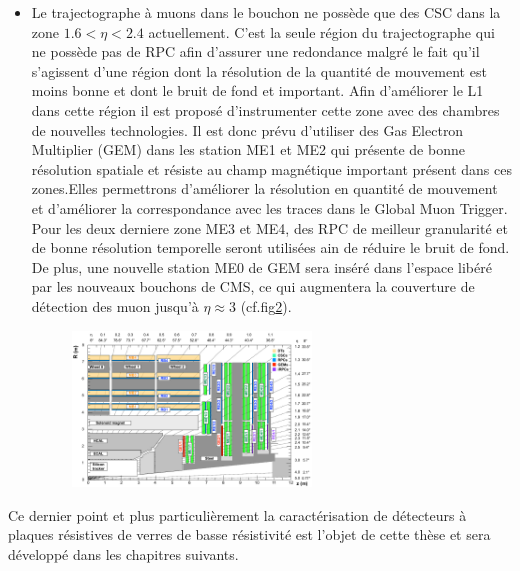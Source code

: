 \begin{itemize}[label=$\bullet$]
\begin{figure}[ht!]
		\label{L1_2}
	\end{figure}
\item Le trajectographe à muons dans le bouchon ne possède que des CSC dans la zone $1.6<\eta<2.4$ actuellement. C'est la seule région du trajectographe qui ne possède pas de RPC afin d'assurer une redondance malgré le fait qu'il s'agissent d'une région dont la résolution de la quantité de mouvement est moins bonne et dont le bruit de fond et important. Afin d'améliorer le L1 dans cette région il est proposé d'instrumenter cette zone avec des chambres de nouvelles technologies. Il est donc prévu d'utiliser des Gas Electron Multiplier (GEM) dans les station ME1 et ME2 qui présente de bonne résolution spatiale et résiste au champ magnétique important présent dans ces zones.Elles permettrons d'améliorer la résolution en quantité de mouvement et d'améliorer la correspondance avec les traces dans le Global Muon Trigger. Pour les deux derniere zone ME3 et ME4, des RPC de meilleur granularité et de bonne résolution temporelle seront utilisées ain de réduire le bruit de fond.  De plus, une nouvelle station ME0 de GEM sera inséré dans l'espace libéré par les nouveaux bouchons de CMS, ce qui augmentera la couverture de détection des muon jusqu'à $\eta\approx3$ (cf.fig\ref{end}). 
	\begin{figure}[ht!]
	\centering
	\includegraphics[width=0.60\textwidth]{CMS/endcap.png}
	\label{end}
\end{figure}
\end{itemize}
Ce dernier point et plus particulièrement la caractérisation de détecteurs à plaques résistives de verres de basse résistivité est l'objet de cette thèse et sera développé dans les chapitres suivants.
